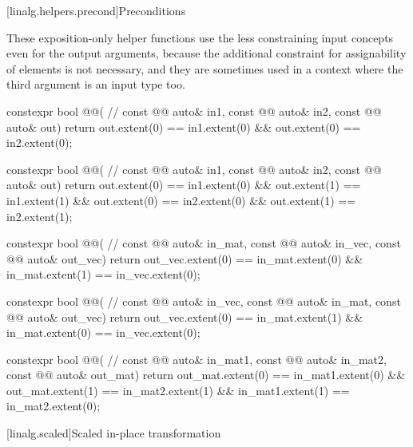 [linalg.helpers.precond]{Preconditions}

\pnum
\begin{note}
These exposition-only helper functions use
the less constraining input concepts even for the output arguments,
because the additional constraint for assignability of elements
is not necessary, and
they are sometimes used in a context
where the third argument is an input type too.
\end{note}

\begin{codeblock}
constexpr bool @@(                                          // \expos
  const @@ auto& in1, const @@ auto& in2, const @@ auto& out) {
  return out.extent(0) == in1.extent(0) && out.extent(0) == in2.extent(0);
}

constexpr bool @@(                                          // \expos
  const @@ auto& in1,  const @@ auto& in2, const @@ auto& out) {
  return out.extent(0) == in1.extent(0) && out.extent(1) == in1.extent(1) &&
         out.extent(0) == in2.extent(0) && out.extent(1) == in2.extent(1);
}

constexpr bool @@(                                     // \expos
  const @@ auto& in_mat, const @@ auto& in_vec, const @@ auto& out_vec) {
  return out_vec.extent(0) == in_mat.extent(0) && in_mat.extent(1) == in_vec.extent(0);
}

constexpr bool @@(                                     // \expos
  const @@ auto& in_vec, const @@ auto& in_mat, const @@ auto& out_vec) {
  return out_vec.extent(0) == in_mat.extent(1) && in_mat.extent(0) == in_vec.extent(0);
}

constexpr bool @@(                                     // \expos
  const @@ auto& in_mat1, const @@ auto& in_mat2, const @@ auto& out_mat) {
  return out_mat.extent(0) == in_mat1.extent(0) && out_mat.extent(1) == in_mat2.extent(1) &&
         in_mat1.extent(1) == in_mat2.extent(0);
}
\end{codeblock}

[linalg.scaled]{Scaled in-place transformation}

